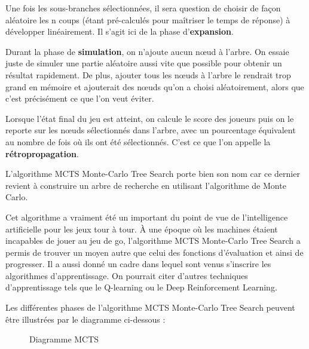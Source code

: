 \documentclass[a4paper]{article}
\begin{document}
\vspace{0.3cm}



Une fois les sous-branches sélectionnées, il sera question de choisir de façon aléatoire les n coups (étant pré-calculés pour maîtriser le temps de réponse) à développer linéairement.
Il s'agit ici de la phase d'\textbf{expansion}.

\vspace{0.3cm}

Durant la phase de \textbf{simulation}, on n’ajoute aucun nœud à l’arbre. On essaie juste de simuler une partie aléatoire aussi vite que possible pour obtenir un résultat rapidement. De plus, ajouter tous les nœuds à l’arbre le rendrait trop grand en mémoire et ajouterait des nœuds qu’on a choisi aléatoirement, alors que c’est précisément ce que l'on veut éviter.

\vspace{0.3cm}


Lorsque l'état final du jeu est atteint, on calcule le score des joueurs puis on le reporte sur les nœuds sélectionnés dans l’arbre, avec un pourcentage équivalent au nombre de fois où ils ont été sélectionnés. 
C’est ce que l'on appelle la \textbf{rétropropagation}.

L’algorithme MCTS Monte-Carlo Tree Search porte bien son nom car ce dernier revient à construire un arbre de recherche en utilisant l'algorithme de Monte Carlo.

Cet algorithme a vraiment été un important du point de vue de l’intelligence artificielle pour les jeux tour à tour. 
À une époque où les machines étaient incapables de jouer au jeu de go, l'algorithme MCTS Monte-Carlo Tree Search a permis de trouver un moyen autre que celui des fonctions d’évaluation et ainsi de progresser. 
Il a aussi donné un cadre dans lequel sont venus s’inscrire les algorithmes d’apprentissage.
On pourrait citer d'autres techniques d'apprentissage tels que le Q-learning ou le Deep Reinforcement Learning.

\vspace{0.2cm}

Les différentes phases de l'algorithme MCTS Monte-Carlo Tree Search peuvent être illustrées par le diagramme ci-dessous :

\begin{figure}[!h] 
\centering
{}
\caption{Diagramme MCTS} 
\end{figure}

\vspace{0.3cm}
\end{document}
